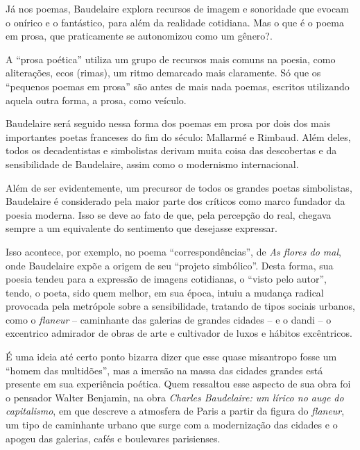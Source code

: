 \documentclass[12pt]{extarticle}
\begin{document}


Já nos poemas, Baudelaire explora recursos de imagem e sonoridade que
evocam o onírico e o fantástico, para além da realidade cotidiana.
Mas o que é o poema em prosa, que praticamente se autonomizou como um
gênero?.

A ``prosa poética'' utiliza um grupo de recursos mais comuns na poesia,
como aliterações, ecos (rimas), um ritmo demarcado mais claramente.
Só que os ``pequenos poemas em prosa'' são antes de mais nada poemas,
escritos utilizando aquela outra forma, a prosa, como veículo.

Baudelaire será seguido nessa forma dos poemas em prosa por dois dos
mais importantes poetas franceses do fim do século: Mallarmé e
Rimbaud.
Além deles, todos os decadentistas e simbolistas derivam muita coisa
das descobertas e da sensibilidade de Baudelaire, assim como o
modernismo internacional.

Além de ser evidentemente, um precursor de todos os grandes poetas
simbolistas, Baudelaire é considerado pela maior parte dos críticos como
marco fundador da poesia moderna. Isso se deve ao fato de que, pela
percepção do real, chegava sempre a um equivalente do
sentimento que desejasse expressar.

Isso acontece, por exemplo, no poema ``correspondências'', de
\emph{As flores do mal}, onde Baudelaire expõe a origem de seu ``projeto simbólico''.
Desta forma, sua poesia tendeu para a expressão de imagens cotidianas, o
``visto pelo autor'', tendo, o poeta, sido quem melhor, em sua época,
intuiu a mudança radical provocada pela
metrópole sobre a
sensibilidade, tratando de tipos sociais urbanos, como o \textit{flaneur} --
caminhante das galerias de grandes cidades -- e o dandi -- o excentrico
admirador de obras de arte e cultivador de luxos e hábitos excêntricos.




É uma ideia até certo ponto bizarra dizer que esse quase misantropo
fosse um ``homem das multidões'', mas a imersão na massa das cidades
grandes está presente em sua experiência poética.
Quem ressaltou esse aspecto de sua obra foi o pensador Walter Benjamin,
na obra \textit{Charles Baudelaire: um lírico no auge do capitalismo}, em
que descreve a atmosfera de Paris a partir da figura do \textit{flaneur}, um
tipo de caminhante urbano que surge com a modernização das cidades e o
apogeu das galerias, cafés e boulevares parisienses.
\end{document}
